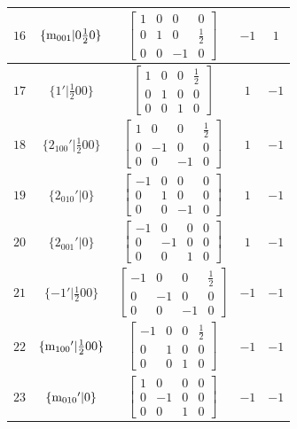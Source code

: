 \documentclass[fleqn,8pt]{jsarticle}
\begin{document}
\begin{longtable}{ccccc}
$ 16 $ & $ \{{\rm m}_{001}|0 \frac{1}{2} 0\} $ & $ \begin{bmatrix} 1 & 0 & 0 & 0 \\ 0 & 1 & 0 & \frac{1}{2} \\ 0 & 0 & -1 & 0 \end{bmatrix} $ & $ -1 $ & $ 1 $ \\ \hline
$ 17 $ & $ \{1{}'|\frac{1}{2} 0 0\} $ & $ \begin{bmatrix} 1 & 0 & 0 & \frac{1}{2} \\ 0 & 1 & 0 & 0 \\ 0 & 0 & 1 & 0 \end{bmatrix} $ & $ 1 $ & $ -1 $ \\ \hline
$ 18 $ & $ \{2{}_{100}{}'|\frac{1}{2} 0 0\} $ & $ \begin{bmatrix} 1 & 0 & 0 & \frac{1}{2} \\ 0 & -1 & 0 & 0 \\ 0 & 0 & -1 & 0 \end{bmatrix} $ & $ 1 $ & $ -1 $ \\ \hline
$ 19 $ & $ \{2{}_{010}{}'|0\} $ & $ \begin{bmatrix} -1 & 0 & 0 & 0 \\ 0 & 1 & 0 & 0 \\ 0 & 0 & -1 & 0 \end{bmatrix} $ & $ 1 $ & $ -1 $ \\ \hline
$ 20 $ & $ \{2{}_{001}{}'|0\} $ & $ \begin{bmatrix} -1 & 0 & 0 & 0 \\ 0 & -1 & 0 & 0 \\ 0 & 0 & 1 & 0 \end{bmatrix} $ & $ 1 $ & $ -1 $ \\ \hline
$ 21 $ & $ \{-1{}'|\frac{1}{2} 0 0\} $ & $ \begin{bmatrix} -1 & 0 & 0 & \frac{1}{2} \\ 0 & -1 & 0 & 0 \\ 0 & 0 & -1 & 0 \end{bmatrix} $ & $ -1 $ & $ -1 $ \\ \hline
$ 22 $ & $ \{{\rm m}_{100}{}'|\frac{1}{2} 0 0\} $ & $ \begin{bmatrix} -1 & 0 & 0 & \frac{1}{2} \\ 0 & 1 & 0 & 0 \\ 0 & 0 & 1 & 0 \end{bmatrix} $ & $ -1 $ & $ -1 $ \\ \hline
$ 23 $ & $ \{{\rm m}_{010}{}'|0\} $ & $ \begin{bmatrix} 1 & 0 & 0 & 0 \\ 0 & -1 & 0 & 0 \\ 0 & 0 & 1 & 0 \end{bmatrix} $ & $ -1 $ & $ -1 $ \\ \hline

\end{longtable}
\end{document}
